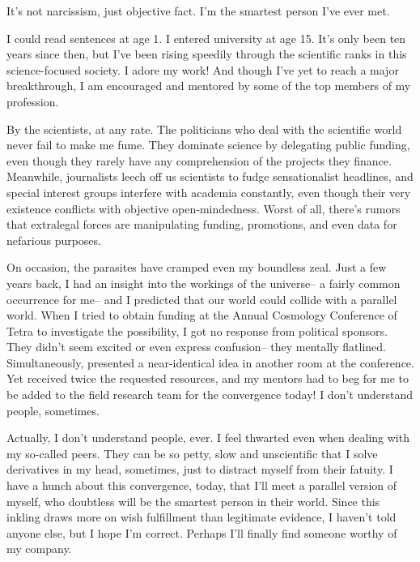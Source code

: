 \documentclass[char]{guildcamp3}
\begin{document}
\name{\cSciTwo{}}

\updatemacro{\cNPC}{
  \unknownplayer %
  }



It's not narcissism, just objective fact. I'm the smartest person I've ever met.

I could read sentences at age 1. I entered university at age 15. It's only been ten years since then, but I've been rising speedily through the scientific ranks in this science-focused society. I adore my work! And though I've yet to reach a major breakthrough, I am encouraged and mentored by some of the top members of my profession.

By the scientists, at any rate. The politicians who deal with the scientific world never fail to make me fume. They dominate science by delegating public funding, even though they rarely have any comprehension of the projects they finance. Meanwhile, journalists leech off us scientists to fudge sensationalist headlines, and special interest groups interfere with academia constantly, even though their very existence conflicts with objective open-mindedness. Worst of all, there's rumors that extralegal forces are manipulating funding, promotions, and even data for nefarious purposes.

On occasion, the parasites have cramped even my boundless zeal. Just a few years back, I had an insight into the workings of the universe-- a fairly common occurrence for me-- and I predicted that our world could collide with a parallel world. When I tried to obtain funding at the Annual Cosmology Conference of Tetra to investigate the possibility, I got no response from political sponsors. They didn't seem excited or even express confusion-- they mentally flatlined. Simultaneously, \cSciOne presented a near-identical idea in another room at the conference. Yet \cSciOne{\they} received twice the requested resources, and my mentors had to beg for me to be added to the field research team for the convergence today! I don't understand people, sometimes.

Actually, I don't understand people, ever. I feel thwarted even when dealing with my so-called peers. They can be so petty, slow and unscientific that I solve derivatives in my head, sometimes, just to distract myself from their fatuity. I have a hunch about this convergence, today, that I'll meet a parallel version of myself, who doubtless will be the smartest person in their world. Since this inkling draws more on wish fulfillment than legitimate evidence, I haven't told anyone else, but I hope I'm correct. Perhaps I'll finally find someone worthy of my company.
\end{document}

